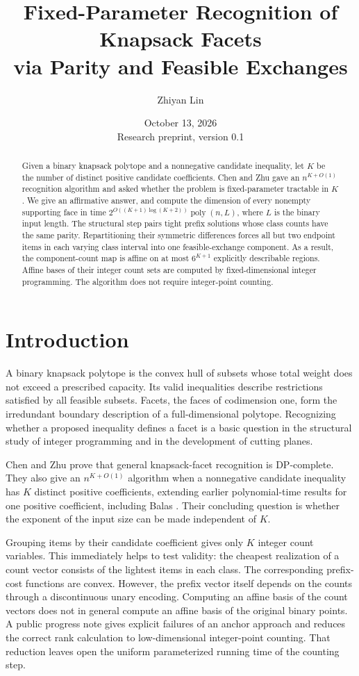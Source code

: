 \documentclass[11pt]{article}
\title{Fixed-Parameter Recognition of Knapsack Facets\\via Parity and Feasible Exchanges}
\author{Zhiyan Lin}
\date{October 13, 2026\\\small Research preprint, version 0.1}
\begin{document}
\maketitle
\begin{abstract}
Given a binary knapsack polytope and a nonnegative candidate inequality, let $K$ be the number of distinct positive candidate coefficients. Chen and Zhu gave an $n^{K+O(1)}$ recognition algorithm and asked whether the problem is fixed-parameter tractable in $K$. We give an affirmative answer, and compute the dimension of every nonempty supporting face in time $2^{O((K+1)\log(K+2))}\operatorname{poly}(n,L)$, where $L$ is the binary input length. The structural step pairs tight prefix solutions whose class counts have the same parity. Repartitioning their symmetric differences forces all but two endpoint items in each varying class interval into one feasible-exchange component. As a result, the component-count map is affine on at most $6^{K+1}$ explicitly describable regions. Affine bases of their integer count sets are computed by fixed-dimensional integer programming. The algorithm does not require integer-point counting.
\end{abstract}

\section{Introduction}
A binary knapsack polytope is the convex hull of subsets whose total weight does not exceed a prescribed capacity. Its valid inequalities describe restrictions satisfied by all feasible subsets. Facets, the faces of codimension one, form the irredundant boundary description of a full-dimensional polytope. Recognizing whether a proposed inequality defines a facet is a basic question in the structural study of integer programming and in the development of cutting planes.

Chen and Zhu \cite{CZ} prove that general knapsack-facet recognition is DP-complete. They also give an $n^{K+O(1)}$ algorithm when a nonnegative candidate inequality has $K$ distinct positive coefficients, extending earlier polynomial-time results for one positive coefficient, including Balas \cite{Balas}. Their concluding question is whether the exponent of the input size can be made independent of $K$.

Grouping items by their candidate coefficient gives only $K$ integer count variables. This immediately helps to test validity: the cheapest realization of a count vector consists of the lightest items in each class. The corresponding prefix-cost functions are convex. However, the prefix vector itself depends on the counts through a discontinuous unary encoding. Computing an affine basis of the count vectors does not in general compute an affine basis of the original binary points. A public progress note \cite{progress} gives explicit failures of an anchor approach and reduces the correct rank calculation to low-dimensional integer-point counting. That reduction leaves open the uniform parameterized running time of the counting step.
\end{document}
